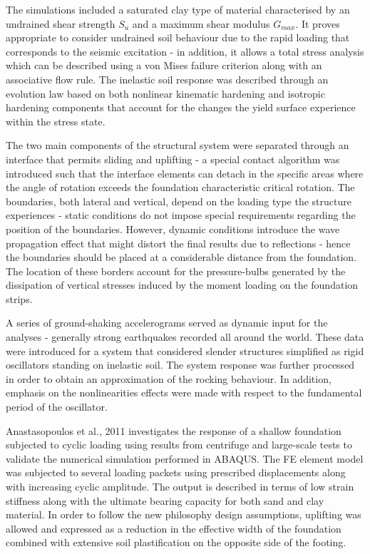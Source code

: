 \documentclass[12pt,a4paper]{report}
\begin{document}
The simulations included a saturated clay type of material characterised by an undrained shear strength $S_u$ and a maximum shear modulus $G_{max}$. It proves appropriate to consider undrained soil behaviour due to the rapid loading that corresponds to the seismic excitation - in addition, it allows a total stress analysis which can be described using a von Mises failure criterion along with an associative flow rule. The inelastic soil response was described through an evolution law based on both nonlinear kinematic hardening and isotropic  hardening components that account for the changes the yield surface experience within the stress state.

The two main components of the structural system were separated through an interface that permits sliding and uplifting - a special contact algorithm was introduced such that the interface elements can detach in the specific areas where the angle of rotation exceeds the foundation characteristic critical rotation. The boundaries, both lateral and vertical, depend on the loading type the structure experiences - static conditions do not impose special requirements regarding the position of the boundaries. However, dynamic conditions introduce the wave propagation effect that might distort the final results due to reflections - hence the boundaries should be placed at a considerable distance from the foundation. The location of these borders account for the pressure-bulbs generated by the dissipation of vertical stresses induced by the moment loading on the foundation strips.

A series of ground-shaking accelerograms served as dynamic input for the analyses - generally strong earthquakes recorded all around the world. These data were introduced for a system that considered slender structures simplified as rigid oscillators standing on inelastic soil. The system response was further processed in order to obtain an approximation of the rocking behaviour. In addition, emphasis on the nonlinearities effects were made with respect to the fundamental period of the oscillator.

Anastasopoulos et al., 2011 \cite{anastasopoulos2011simplified} investigates the response of a shallow foundation subjected to cyclic loading using results from centrifuge and large-scale tests to validate the numerical simulation performed in ABAQUS. The FE element model was subjected to several loading packets using prescribed displacements along with increasing cyclic amplitude. The output is described in terms of low strain stiffness along with the ultimate bearing capacity for both sand and clay material. In order to follow the new philosophy design assumptions, uplifting was allowed and expressed as a reduction in the effective width of the foundation combined with extensive soil plastification on the opposite side of the footing.
\end{document}
